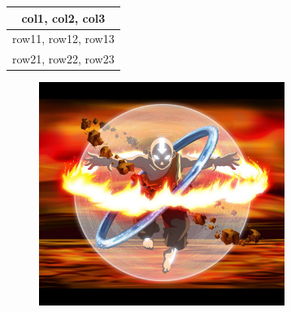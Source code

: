 \documentclass[12pt, a4paper] {article}
\begin{document}
\begin{center}
\begin{tabular}{|| c ||}
 \hline
 col1, col2, col3 \\
 \hline\hline
 row11, row12, row13  \\
 \hline
 row21, row22, row23  \\
 \hline
\end{tabular}
\end{center}

\begin{figure}[t]
\includegraphics[width=8cm]{image1.png}
\centering
\end{figure}
\end{document}
